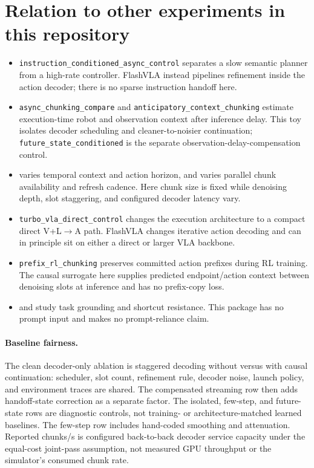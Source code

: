 \documentclass[11pt]{article}
\begin{document}
\section{Relation to other experiments in this repository}
\begin{itemize}[leftmargin=1.5em]
\item \texttt{instruction\_conditioned\_async\_control} separates a slow semantic planner from a high-rate controller. FlashVLA instead pipelines refinement inside the action decoder; there is no sparse instruction handoff here.
\item \texttt{async\_chunking\_compare} and \texttt{anticipatory\_context\_chunking} estimate execution-time robot and observation context after inference delay. This toy isolates decoder scheduling and cleaner-to-noisier continuation; \texttt{future\_state\_conditioned} is the separate observation-delay-compensation control.
\item {} varies temporal context and action horizon, and  varies parallel chunk availability and refresh cadence. Here chunk size is fixed while denoising depth, slot staggering, and configured decoder latency vary.
\item \texttt{turbo\_vla\_direct\_control} changes the execution architecture to a compact direct V+L$\rightarrow$A path. FlashVLA changes iterative action decoding and can in principle sit on either a direct or larger VLA backbone.
\item \texttt{prefix\_rl\_chunking} preserves committed action prefixes during RL training. The causal surrogate here supplies predicted endpoint/action context between denoising slots at inference and has no prefix-copy loss.
\item {} and  study task grounding and shortcut resistance. This package has no prompt input and makes no prompt-reliance claim.
\end{itemize}

\paragraph{Baseline fairness.}
The clean decoder-only ablation is staggered decoding without versus with causal continuation: scheduler, slot count, refinement rule, decoder noise, launch policy, and environment traces are shared. The compensated streaming row then adds handoff-state correction as a separate factor. The isolated, few-step, and future-state rows are diagnostic controls, not training- or architecture-matched learned baselines. The few-step row includes hand-coded smoothing and attenuation. Reported chunks/s is configured back-to-back decoder service capacity under the equal-cost joint-pass assumption, not measured GPU throughput or the simulator's consumed chunk rate.
\end{document}
